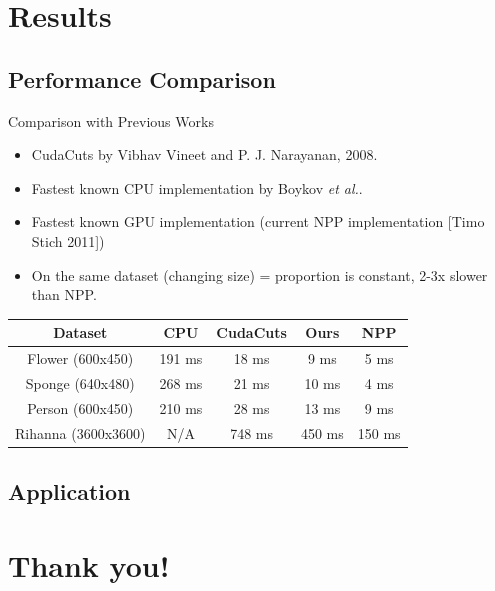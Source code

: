 \documentclass{beamer}
\begin{document}
\section{Results}

\subsection{Performance Comparison}

\begin{frame}{Comparison with Previous Works}
\begin{itemize}
\item
CudaCuts by Vibhav Vineet and P. J. Narayanan, 2008.
\item
Fastest known CPU implementation by Boykov \emph{et al.}.
\item
Fastest known GPU implementation (current NPP implementation [Timo Stich 2011])
\item
On the same dataset (changing size) = proportion is constant, 2-3x slower than NPP.
\end{itemize}

 \begin{tabular}{|c|c|c|c|c|}
\hline
\textbf{Dataset}   &  \textbf{CPU}    & \textbf{CudaCuts} & \textbf{Ours}    & \textbf{NPP} \\
\hline
Flower (600x450)   &  191 ms & 18 ms    & 9 ms    & 5 ms   \\
Sponge (640x480)   &  268 ms & 21 ms    & 10 ms   & 4 ms   \\
Person (600x450)   &  210 ms & 28 ms    & 13 ms   & 9 ms   \\
Rihanna (3600x3600)&  N/A    & 748 ms   & 450 ms  & 150 ms \\
\hline
\end{tabular}
\end{frame}


\subsection{Application}




\section*{Thank you!}
\end{document}
